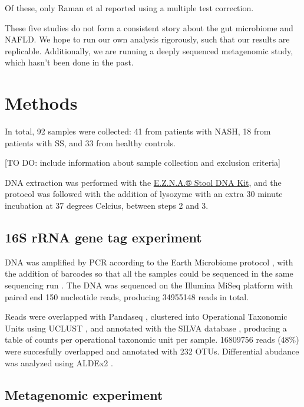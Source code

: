 Of these, only Raman et al \cite{raman2013fecal} reported using a multiple test correction.

These five studies do not form a consistent story about the gut microbiome and NAFLD. We hope to run our own analysis rigorously, such that our results are replicable. Additionally, we are running a deeply sequenced metagenomic study, which hasn’t been done in the past.

\FloatBarrier

\section{Methods}
In total, 92 samples were collected: 41 from patients with NASH, 18 from patients with SS, and 33 from healthy controls.

[TO DO: include information about sample collection and exclusion criteria]

DNA extraction was performed with the \href{http://omegabiotek.com/store/product/stool-dna-kit/}{E.Z.N.A.® Stool DNA Kit}, and the protocol was followed with the addition of lysozyme with an extra 30 minute incubation at 37 degrees Celcius, between steps 2 and 3.

\subsection{16S rRNA gene tag experiment}

DNA was amplified by PCR according to the Earth Microbiome protocol \cite{caporaso2012ultra}, with the addition of barcodes so that all the samples could be sequenced in the same sequencing run \cite{gloor2010microbiome}. The DNA was sequenced on the Illumina MiSeq platform with paired end 150 nucleotide reads, producing 34955148 reads in total.

Reads were overlapped with Pandaseq \cite{masella2012pandaseq}, clustered into Operational Taxonomic Units using UCLUST \cite{edgar2010search}, and annotated with the SILVA database \cite{quast2013silva}, producing a table of counts per operational taxonomic unit per sample. 16809756 reads (48\%) were succesfully overlapped and annotated with 232 OTUs. Differential abudance was analyzed using ALDEx2 \cite{fernandes2014unifying}.

\subsection{Metagenomic experiment}

